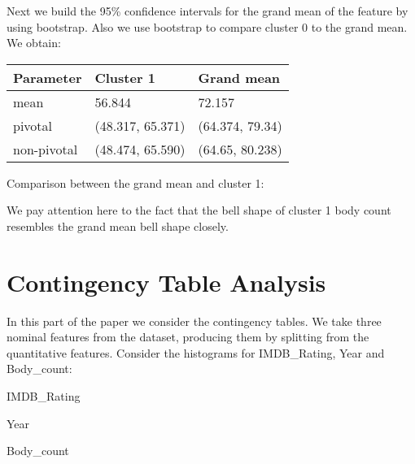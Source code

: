 \documentclass[a4paper,14pt]{article}
\begin{document}
\normalsize


Next we build the 95\% confidence intervals for the grand mean of the feature by using bootstrap. Also we use bootstrap to compare cluster 0 to the grand mean.  We obtain:


\begin{center}
	\begin{tabular}{|l|l|l|}
		\hline
		\textbf{Parameter} & \textbf{Cluster 1}  & \textbf{Grand mean}  \\ \hline
		mean & 56.844 & 72.157 \\ \hline
		pivotal & (48.317, 65.371) & (64.374, 79.34)  \\ \hline
		non-pivotal & (48.474, 65.590)  & (64.65, 80.238)  \\ \hline
	\end{tabular}
\end{center}

\normalsize

Comparison between the grand mean and cluster 1:
    \begin{center}
\end{center}
We pay attention here to the fact that the bell shape of cluster 1 body count resembles the grand mean bell shape closely.



    \section{Contingency Table Analysis}
    
In this part of the paper we consider the contingency tables. We take three nominal features from the dataset, producing them by splitting from the quantitative features. Consider the histograms for IMDB\_Rating, Year and Body\_count:

\newpage
\begin{multicols}{2}
    \begin{center}
	IMDB\_Rating
\end{center}
\begin{center}
	Year
\end{center}
    \begin{center}
	 Body\_count
\end{center}

\end{multicols}
\end{document}
